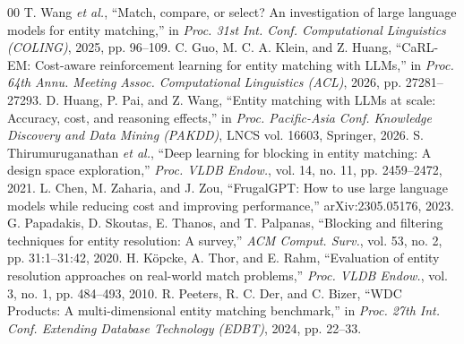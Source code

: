 \documentclass[conference]{IEEEtran}
\begin{document}
\begin{thebibliography}{00}
 T. Wang \textit{et al.}, ``Match, compare, or select? An investigation of large language models for entity matching,'' in \textit{Proc. 31st Int. Conf. Computational Linguistics (COLING)}, 2025, pp. 96--109.
 C. Guo, M. C. A. Klein, and Z. Huang, ``CaRL-EM: Cost-aware reinforcement learning for entity matching with LLMs,'' in \textit{Proc. 64th Annu. Meeting Assoc. Computational Linguistics (ACL)}, 2026, pp. 27281--27293.
 D. Huang, P. Pai, and Z. Wang, ``Entity matching with LLMs at scale: Accuracy, cost, and reasoning effects,'' in \textit{Proc. Pacific-Asia Conf. Knowledge Discovery and Data Mining (PAKDD)}, LNCS vol. 16603, Springer, 2026.
 S. Thirumuruganathan \textit{et al.}, ``Deep learning for blocking in entity matching: A design space exploration,'' \textit{Proc. VLDB Endow.}, vol. 14, no. 11, pp. 2459--2472, 2021.
 L. Chen, M. Zaharia, and J. Zou, ``FrugalGPT: How to use large language models while reducing cost and improving performance,'' arXiv:2305.05176, 2023.
 G. Papadakis, D. Skoutas, E. Thanos, and T. Palpanas, ``Blocking and filtering techniques for entity resolution: A survey,'' \textit{ACM Comput. Surv.}, vol. 53, no. 2, pp. 31:1--31:42, 2020.
 H. K\"opcke, A. Thor, and E. Rahm, ``Evaluation of entity resolution approaches on real-world match problems,'' \textit{Proc. VLDB Endow.}, vol. 3, no. 1, pp. 484--493, 2010.
 R. Peeters, R. C. Der, and C. Bizer, ``WDC Products: A multi-dimensional entity matching benchmark,'' in \textit{Proc. 27th Int. Conf. Extending Database Technology (EDBT)}, 2024, pp. 22--33.
\end{thebibliography}

\end{document}
